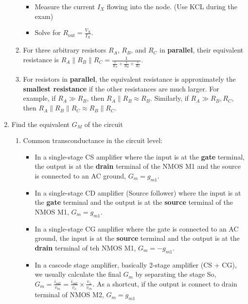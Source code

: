 \documentclass[10pt, landscape]{article}
\begin{document}
\begin{multicols}{4}
\begin{enumerate}
\begin{enumerate}
\begin{itemize}
            \item Measure the current $I_X$ flowing into the node. (Use KCL during the exam)
            \item Solve for $R_{\text{out}}=\frac{V_X}{I_X}$.
        \end{itemize}
        \item For three arbitrary resistors $R_A$, $R_B$, and $R_C$ in \textbf{parallel}, their equivalent resistance is $R_A \parallel R_B \parallel R_C = \frac{1}{\frac{1}{R_A}+\frac{1}{R_B}+\frac{1}{R_C}}$.
        \item For resistors in \textbf{parallel}, the equivalent resistance is approximately the \textbf{smallest resistance} if the other resistances are much larger. For example, if $R_A \gg R_B$, then $R_A \parallel R_B \approx R_B$. Similarly, if $R_A \gg R_B, R_C$, then $R_A \parallel R_B \parallel R_C \approx R_B \parallel R_C$.
    \end{enumerate}
    \item Find the equivalent $G_M$ of the circuit
    \begin{enumerate}
        \item Common transconductance in the circuit level:
        \begin{itemize}
            \item In a single-stage CS amplifier where the input is at the \textbf{gate} terminal, the output is at the \textbf{drain} terminal of the NMOS M1 and the source is connected to an AC ground, $G_m=g_{m1}$.
            \item In a single-stage CD amplifier (Source follower) where the input is at the \textbf{gate} terminal and the output is at the \textbf{source} terminal of the NMOS M1, $G_m=g_{m1}$.
            \item In a single-stage CG amplifier where the gate is connected to an AC ground, the input is at the \textbf{source} terminal and the output is at the \textbf{drain} terminal of teh NMOS M1, $G_m=-g_{m1}$.
            \item In a cascode stage amplifier, basically 2-stage amplifier (CS + CG), we usually calculate the final $G_m$ by separating the stage
            So, $G_m=\frac{i_{out}}{v_{in}}=\frac{i_{out}}{v_{x}}\times\frac{v_{x}}{v_{in}}$. As a shortcut, if the output is connect to drain terminal of NMOS M2, $G_m=g_{m1}$

\end{itemize}
\end{enumerate}
\end{enumerate}
\end{multicols}
\end{document}
